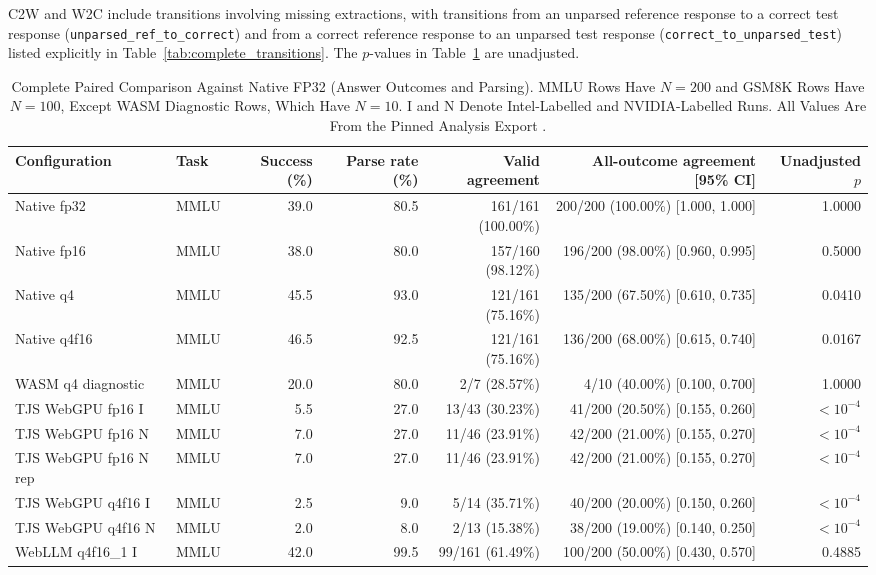 \documentclass[conference]{IEEEtran}
\begin{document}
C2W and W2C include transitions involving missing extractions,
with transitions from an unparsed reference response to a
correct test response (\texttt{unparsed\_ref\_to\_correct})
and from a correct reference response to an unparsed test
response (\texttt{correct\_to\_unparsed\_test}) listed
explicitly in Table~\ref{tab:complete_transitions}. The
$p$-values in Table~\ref{tab:complete_outcomes} are
unadjusted.

\begin{table}[!t]
\caption{
Complete Paired Comparison Against Native FP32 (Answer Outcomes and Parsing).
MMLU Rows Have $N=200$ and GSM8K Rows Have $N=100$,
Except WASM Diagnostic Rows, Which Have $N=10$.
I and N Denote Intel-Labelled and NVIDIA-Labelled Runs.
All Values Are From the Pinned Analysis Export
\cite{repository}.
}
\label{tab:complete_outcomes}
\centering
\small
\setlength{\tabcolsep}{6pt}
\begin{tabular}{@{}llrrrrr@{}}
\toprule
Configuration & Task & Success (\%) & Parse rate (\%) & Valid agreement & All-outcome agreement [95\% CI] & Unadjusted $p$\\
\midrule
Native fp32 & MMLU & 39.0 & 80.5 & 161/161 (100.00\%) & 200/200 (100.00\%) [1.000, 1.000] & 1.0000\\
Native fp16 & MMLU & 38.0 & 80.0 & 157/160 (98.12\%) & 196/200 (98.00\%) [0.960, 0.995] & 0.5000\\
Native q4 & MMLU & 45.5 & 93.0 & 121/161 (75.16\%) & 135/200 (67.50\%) [0.610, 0.735] & 0.0410\\
Native q4f16 & MMLU & 46.5 & 92.5 & 121/161 (75.16\%) & 136/200 (68.00\%) [0.615, 0.740] & 0.0167\\
WASM q4 diagnostic & MMLU & 20.0 & 80.0 & 2/7 (28.57\%) & 4/10 (40.00\%) [0.100, 0.700] & 1.0000\\
TJS WebGPU fp16 I & MMLU & 5.5 & 27.0 & 13/43 (30.23\%) & 41/200 (20.50\%) [0.155, 0.260] & $<10^{-4}$\\
TJS WebGPU fp16 N & MMLU & 7.0 & 27.0 & 11/46 (23.91\%) & 42/200 (21.00\%) [0.155, 0.270] & $<10^{-4}$\\
TJS WebGPU fp16 N rep & MMLU & 7.0 & 27.0 & 11/46 (23.91\%) & 42/200 (21.00\%) [0.155, 0.270] & $<10^{-4}$\\
TJS WebGPU q4f16 I & MMLU & 2.5 & 9.0 & 5/14 (35.71\%) & 40/200 (20.00\%) [0.150, 0.260] & $<10^{-4}$\\
TJS WebGPU q4f16 N & MMLU & 2.0 & 8.0 & 2/13 (15.38\%) & 38/200 (19.00\%) [0.140, 0.250] & $<10^{-4}$\\
WebLLM q4f16\_1 I & MMLU & 42.0 & 99.5 & 99/161 (61.49\%) & 100/200 (50.00\%) [0.430, 0.570] & 0.4885\\

\end{tabular}
\end{table}
\end{document}
